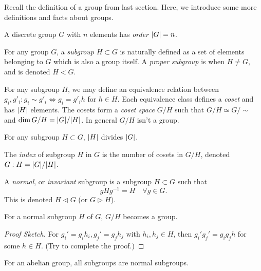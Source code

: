 \documentclass[a4paper,11pt]{article}
\begin{document}
	Recall the definition of a group from last section. Here, we introduce some more definitions and facts about groups.

	\begin{defi}
		A discrete group $G$ with $n$ elements has \emph{order} $\abs{G} = n$.
	\end{defi}

	\begin{defi}
		For any group $G$, a \emph{subgroup} $H \subset G$ is naturally defined as a set of elements belonging to $G$  which is also a group itself. A \emph{proper subgroup} is when $H \neq G$, and is denoted $H < G$.
	\end{defi}

	\begin{defi}
		For any subgroup $H$, we may define an equivalence relation between $g_i, g'_i : g_i \sim g'_i \Leftrightarrow g_i = g'_i h$ for $h \in H$. Each equivalence class defines a \emph{coset} and has $\abs{H}$ elements. The cosets form a \emph{coset space} $G/H$ such that $G/H \simeq G/\sim$ and $\dim G/H = \abs{G}/ \abs{H}$. In general $G/H$ isn't a group.
	\end{defi}

	\begin{thm}
		For any subgroup $H \subset G$, $\abs{H}$ divides $\abs{G}$.
	\end{thm}

	\begin{defi}
		The \emph{index} of subgroup $H$ in $G$ is the number of cosets in $G/H$, denoted $G:H = \abs{G}/\abs{H}$.
	\end{defi}

	\begin{defi}
		A \emph{normal}, or \emph{invariant} subgroup is a subgroup $H \subset G$ such that
		\[
			g H g^{-1} = H \quad \forall g \in G.
		\]
		This is denoted $H \triangleleft G$ (or $G \triangleright H$).
	\end{defi}

	\begin{prop}
		For a normal subgroup $H$ of $G$, $G/H$ becomes a group.
	\end{prop}
	\begin{proof}[Proof Sketch]
		For $g_i' = g_i h_i, g_j' = g_j h_j$ with $h_i, h_j \in H$, then $g_i' g_j' = g_i g_j h$ for some $h \in H$. (Try to complete the proof.)
	\end{proof}
	\begin{cor}
		For an abelian group, all subgroups are normal subgroups.
	\end{cor}
\end{document}
